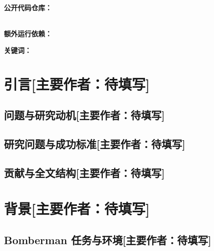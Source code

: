 \documentclass[UTF8,11pt,a4paper,fontset=none]{ctexart}
\title{\todoitem{报告标题}}
\author{
  \todoitem{成员姓名 1}\quad
  \todoitem{成员姓名 2}\quad
  \todoitem{成员姓名 3}\\
  \small Machine Learning Essentials, Summer Semester 2026
}
\date{\today}
\newcommand{\primaryauthor}[1]{\texorpdfstring{\enspace\normalfont\small[主要作者：#1]}{ [主要作者：#1]}}
\newcommand{\authorsection}[2]{\section{#1\primaryauthor{#2}}}
\newcommand{\authorsubsection}[2]{\subsection{#1\primaryauthor{#2}}}
\newcommand{\pendingauthor}{待填写}
\newif\ifdraftguidance
\newcommand{\writingnote}[1]{%
  \ifdraftguidance
    \par\noindent\begingroup\color{promptblue}\small
    \fbox{\begin{minipage}{0.94\linewidth}\textbf{写作提示：}#1\end{minipage}}%
    \par\endgroup
  \fi
}
\newcommand{\todoitem}[1]{%
  \ifdraftguidance\textcolor{promptblue}{\textbf{[待补：#1]}}\fi
}
\begin{document}
\maketitle

\writingnote{提交前确认课程是否接受中文及其字数折算规则。课程要求的总篇幅约为每名成员 4,000 English words，且不应明显超出。报告中不要使用大学 Logo。}

\begin{center}
  \textbf{公开代码仓库：}\todoitem{公开仓库 URL}\\
  \textbf{额外运行依赖：}\todoitem{没有则写“无”；有则列名称与版本}
\end{center}

\begin{abstract}
\writingnote{用一段自洽文字概括：研究问题、比较的模型、统一评估方法、最重要的定量结果、最终模型及选择依据。摘要最后写清结论的适用边界；不要引用文献，也不要加入正文未报告的结果。}
\todoitem{摘要正文}
\end{abstract}

\noindent\textbf{关键词：}\todoitem{3--5 个关键词}

\tableofcontents
\clearpage

\writingnote{全文必须覆盖团队开发的所有模型，并说明最终模型的选择依据。建议把最多篇幅留给“实验与结果”；扩写应来自实验假设、协议、结果、失败解释和决策依据，而不是重复算法定义。}

\authorsection{引言}{\pendingauthor}
\writingnote{简要说明问题、研究价值和主要挑战；提出全文研究问题并概括贡献。避免在此堆叠所有实验数字。}

\authorsubsection{问题与研究动机}{\pendingauthor}
\writingnote{说明 Bomberman 中导航、稀疏奖励、延迟爆炸、多智能体竞争与 CPU 推理时限为何构成机器学习问题。}
\todoitem{正文}

\authorsubsection{研究问题与成功标准}{\pendingauthor}
\writingnote{列出 2--4 个可由实验回答的研究问题。为每个问题定义可观测指标和判断标准，例如得分、金币、击杀、生存率、全收集率、WAIT/循环和完整 act 延迟。}
\todoitem{正文}

\authorsubsection{贡献与全文结构}{\pendingauthor}
\writingnote{只概括有证据支持的贡献，并用一小段介绍后续章节。不要把计划或未验证功能写成贡献。}
\todoitem{正文}

\authorsection{背景}{\pendingauthor}
\writingnote{比引言更具体地描述任务，并概述团队考虑过的强化学习方法。引用原始或权威文献，避免写成通用教材摘录。}

\authorsubsection{Bomberman 任务与环境}{\pendingauthor}
\writingnote{交代状态、六个动作、奖励目标、炸弹时序、障碍、回合长度和正式 CPU/内存/决策时间约束。所有数值应回查课程材料与源码。}
\todoitem{正文}
\end{document}
